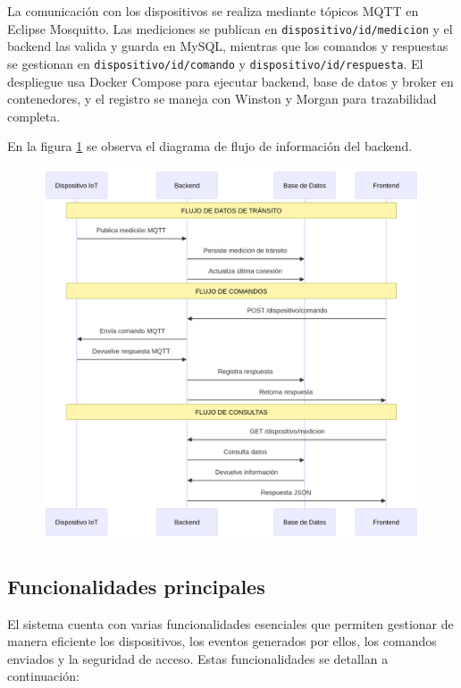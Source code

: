 La comunicación con los dispositivos se realiza mediante tópicos MQTT en Eclipse Mosquitto. Las mediciones se publican en \texttt{dispositivo/{id}/medicion} y el backend las valida y guarda en MySQL, mientras que los comandos y respuestas se gestionan en \texttt{dispositivo/{id}/comando} y \texttt{dispositivo/{id}/respuesta}. El despliegue usa Docker Compose \cite{docker_compose} para ejecutar backend, base de datos y broker \cite{mqttSpec} en contenedores, y el registro se maneja con Winston \cite{winston} y Morgan \cite{morgan} para trazabilidad completa.

En la figura \ref{fig:diagrama_backend} se observa el diagrama de flujo de información del backend.


\begin{figure}[H]
 
  \centering
  \includegraphics[width=0.9\linewidth]{./Figures/diagFlujoConexionBackend.png}
  \label{fig:diagrama_backend}
  \end{figure}

\FloatBarrier
\subsection{Funcionalidades principales}
El sistema cuenta con varias funcionalidades esenciales que permiten gestionar de manera eficiente los dispositivos, los eventos generados por ellos, los comandos enviados y la seguridad de acceso. Estas funcionalidades se detallan a continuación:

